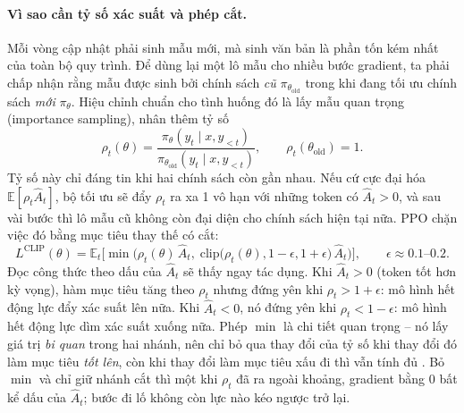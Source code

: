 \paragraph{Vì sao cần tỷ số xác suất và phép cắt.}
Mỗi vòng cập nhật phải sinh mẫu mới, mà sinh văn bản là phần tốn kém nhất của toàn bộ quy trình. Để dùng lại một lô mẫu cho nhiều bước gradient, ta phải chấp nhận rằng mẫu được sinh bởi chính sách \emph{cũ} \( \pi_{\theta_{\text{old}}} \) trong khi đang tối ưu chính sách \emph{mới} \( \pi_{\theta} \). Hiệu chỉnh chuẩn cho tình huống đó là lấy mẫu quan trọng (importance sampling), nhân thêm tỷ số
\[
    \rho_t(\theta) = \frac{
        \pi_{\theta}(y_t \mid x, y_{<t})
    }{
        \pi_{\theta_{\text{old}}}(y_t \mid x, y_{<t})
    },
    \qquad
    \rho_t(\theta_{\text{old}}) = 1 .
\]
Tỷ số này chỉ đáng tin khi hai chính sách còn gần nhau. Nếu cứ cực đại hóa \( \mathbb{E}[\rho_t \hat{A}_t] \), bộ tối ưu sẽ đẩy \( \rho_t \) ra xa 1 vô hạn với những token có \( \hat{A}_t > 0 \), và sau vài bước thì lô mẫu cũ không còn đại diện cho chính sách hiện tại nữa. PPO chặn việc đó bằng mục tiêu thay thế có cắt:
\[
    L^{\text{CLIP}}(\theta)
    = \mathbb{E}_{t}
    \Big[
        \min\Big(
            \rho_t(\theta) \, \hat{A}_t,\;
            \text{clip}\big(\rho_t(\theta), 1 - \epsilon, 1 + \epsilon\big) \, \hat{A}_t
        \Big)
    \Big],
    \qquad \epsilon \approx 0.1 \text{--} 0.2 .
\]
Đọc công thức theo dấu của \( \hat{A}_t \) sẽ thấy ngay tác dụng. Khi \( \hat{A}_t > 0 \) (token tốt hơn kỳ vọng), hàm mục tiêu tăng theo \( \rho_t \) nhưng đứng yên khi \( \rho_t > 1 + \epsilon \): mô hình hết động lực đẩy xác suất lên nữa. Khi \( \hat{A}_t < 0 \), nó đứng yên khi \( \rho_t < 1 - \epsilon \): mô hình hết động lực dìm xác suất xuống nữa. Phép \( \min \) là chi tiết quan trọng -- nó lấy giá trị \emph{bi quan} trong hai nhánh, nên chỉ bỏ qua thay đổi của tỷ số khi thay đổi đó làm mục tiêu \emph{tốt lên}, còn khi thay đổi làm mục tiêu xấu đi thì vẫn tính đủ \cite{schulman2017proximal}. Bỏ \( \min \) và chỉ giữ nhánh cắt thì một khi \( \rho_t \) đã ra ngoài khoảng, gradient bằng 0 bất kể dấu của \( \hat{A}_t \); bước đi lố không còn lực nào kéo ngược trở lại.

